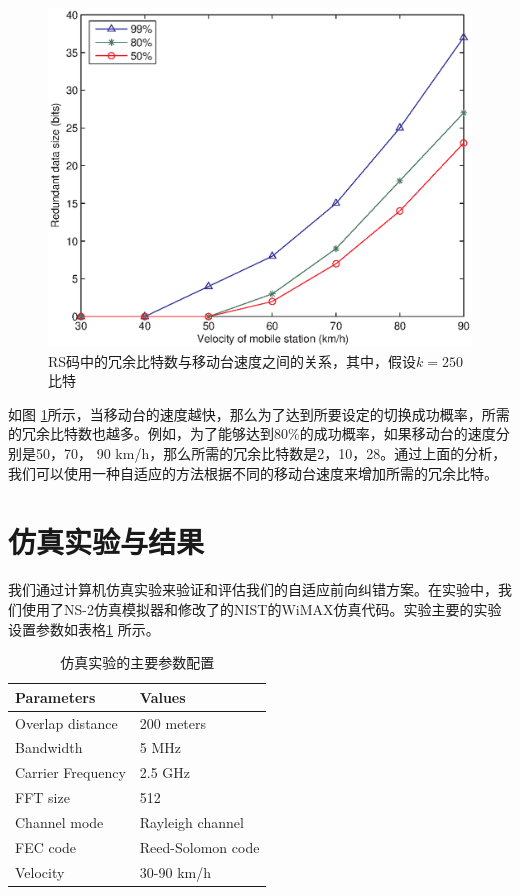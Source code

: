 \begin{figure}[htbp]
\begin{centering}
\includegraphics[scale=0.7]{iccs_speed_size_theory}
\caption{RS码中的冗余比特数与移动台速度之间的关系，其中，假设$k=250$比特}
\label{fig:chap_iccs_handover_algorithm_AFEC_bits}
\end{centering}
\end{figure}

如图 \ref{fig:chap_iccs_handover_algorithm_AFEC_bits}所示，当移动台的速度越快，那么为了达到所要设定的切换成功概率，所需的冗余比特数也越多。例如，为了能够达到$80\%$的成功概率，如果移动台的速度分别是50，70， 90 km/h，那么所需的冗余比特数是2，10，28。通过上面的分析，我们可以使用一种自适应的方法根据不同的移动台速度来增加所需的冗余比特。

\section{仿真实验与结果}
我们通过计算机仿真实验来验证和评估我们的自适应前向纠错方案。在实验中，我们使用了NS-2仿真模拟器和修改了的NIST的WiMAX仿真代码。实验主要的实验设置参数如表格\ref{chap_iccs_table_I} 所示。

\begin{table}[h]
\centering
\caption{仿真实验的主要参数配置}\label{chap_iccs_table_I}
\begin{tabular}{ll} \hline Parameters  &
Values\tabularnewline \hline Overlap distance  & 200
meters\tabularnewline Bandwidth  & 5 MHz\tabularnewline Carrier
Frequency  & 2.5 GHz\tabularnewline FFT size  & 512\tabularnewline
Channel mode  & Rayleigh channel\tabularnewline FEC code  &
Reed-Solomon code\tabularnewline Velocity  &
30-90 km/h\tabularnewline \hline
\end{tabular}
\end{table}

